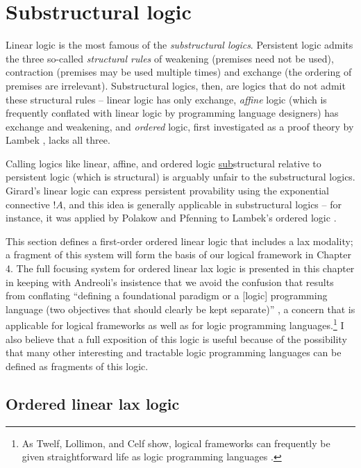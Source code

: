 \chapter{Substructural logic}

Linear logic is the most famous of the {\it substructural logics}.
Persistent logic admits the three so-called {\it structural rules} of
weakening (premises need not be used), contraction (premises may be
used multiple times) and exchange (the ordering of premises are 
irrelevant). Substructural logics, then, are logics that do not admit
these structural rules -- linear logic has only exchange, 
{\it affine} logic (which is frequently conflated with linear logic
by programming language designers) has exchange and weakening, and
{\it ordered} logic, first investigated as a proof theory by Lambek
\cite{lambek58mathematics}, lacks all three. 

Calling logics like linear, affine, and ordered logic
\underline{sub}structural relative to persistent logic (which is
structural) is arguably unfair to the substructural logics. Girard's
linear logic can express persistent provability using the exponential
connective ${!}A$, and this idea is generally applicable in
substructural logics -- for instance, it was applied by Polakow and
Pfenning to Lambek's ordered logic
\cite{polakow99natural}. 

This section defines a first-order ordered linear logic that includes
a lax modality; a fragment of this system will form the basis of our
logical framework in Chapter 4. The full focusing system for ordered
linear lax logic is presented in this chapter in keeping with
Andreoli's insistence that we avoid the confusion that results from
conflating ``defining a foundational paradigm or a [logic] programming
language (two objectives that should clearly be kept separate)''
\cite{andreoli01focussing}, a concern that is applicable for logical
frameworks as well as for logic programming
languages.\footnote{As Twelf, Lollimon, and Celf
  show, logical frameworks can frequently be given straightforward
  life as logic programming languages
  \cite{pfenning99system,lopez05monadic,schacknielsen08celf}.} I 
also believe that a full exposition of this logic is useful because
of the possibility that many other interesting and tractable logic
programming languages can be defined as fragments of this logic.

\section{Ordered linear lax logic}

